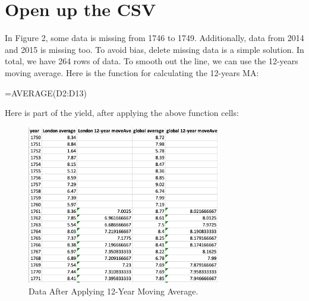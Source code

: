 \documentclass{article}
\begin{document}

\section{Open up the CSV}
In Figure 2, some data is missing from 1746 to 1749. Additionally, data from 2014 and 2015 is missing too. To avoid bias, delete missing data is a simple solution. In total, we have 264 rows of data. To smooth out the line, we can use the 12-years moving average. Here is the function for calculating the 12-years MA:
\begin{center} =AVERAGE(D2:D13) \end{center}
Here is part of the yield, after applying the above function cells:
\begin{figure}[ht]
  \begin{center}
    \includegraphics[width=0.75\textwidth]{average_function}
    \caption{Data After Applying 12-Year Moving Average.}
  \end{center}
\end{figure}

\end{document}
